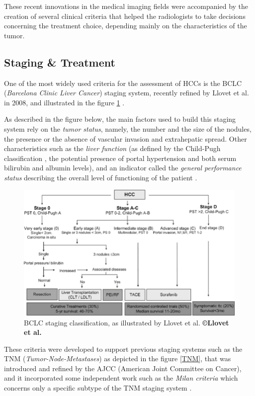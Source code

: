 These recent innovations in the medical imaging fields were accompanied
by the creation of several clinical criteria that helped the
radiologists to take decisions concerning the treatment choice,
depending mainly on the characteristics of the tumor.

\subsection{Staging \& Treatment}\label{staging-treatment}

One of the most widely used criteria for the assessment of HCCs
is the BCLC (\emph{Barcelona Clinic Liver Cancer}) staging system, recently refined by Llovet et al. in
2008, and illustrated in the figure \ref{BCLC_llovet} \cite{Llovet2008}.

As described in the figure below, the main factors used to build this
staging system rely on the \emph{tumor status}, namely, the number and
the size of the nodules, the presence or the absence of vascular
invasion and extrahepatic spread. Other characteristics such as the
\emph{liver function} (as defined by the Child-Pugh classification
\cite{Pugh1973} , the potential presence of portal
hypertension and both serum bilirubin and albumin levels), and an
indicator called the \emph{general performance status} describing the
overall level of functioning of the patient \cite{Oken1982}.

\begin{figure}[th!]
\centering
\includegraphics[width=0.8\linewidth]{images/BCLC}
\caption{BCLC staging classification, as illustrated by Llovet et al. \textbf{©Llovet et al. \cite{Llovet2008}}}
\label{BCLC_llovet}
\end{figure}



These criteria were developed to support previous staging systems such
as the TNM (\emph{Tumor-Node-Metastases}) as depicted in the figure \ref{TNM}, that was introduced and refined by
the AJCC (American Joint Committee on Cancer), and it incorporated some independent work such as the
\emph{Milan criteria} which concerns only a specific subtype of the
TNM staging system \cite{Mazzaferro1996}.


